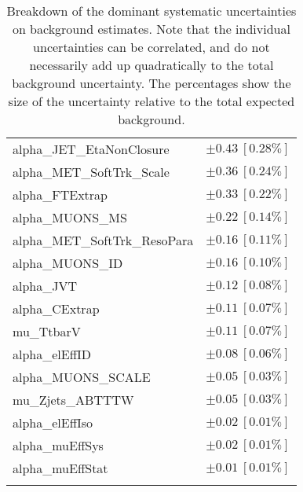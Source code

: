 \begin{table}
\begin{center}
\begin{tabular*}{\textwidth}{@{\extracolsep{\fill}}lc}
alpha\_JET\_EtaNonClosure         & $\pm 0.43\ [0.28\%] $       \\
alpha\_MET\_SoftTrk\_Scale         & $\pm 0.36\ [0.24\%] $       \\
alpha\_FTExtrap         & $\pm 0.33\ [0.22\%] $       \\
alpha\_MUONS\_MS         & $\pm 0.22\ [0.14\%] $       \\
alpha\_MET\_SoftTrk\_ResoPara         & $\pm 0.16\ [0.11\%] $       \\
alpha\_MUONS\_ID         & $\pm 0.16\ [0.10\%] $       \\
alpha\_JVT         & $\pm 0.12\ [0.08\%] $       \\
alpha\_CExtrap         & $\pm 0.11\ [0.07\%] $       \\
mu\_TtbarV         & $\pm 0.11\ [0.07\%] $       \\
alpha\_elEffID         & $\pm 0.08\ [0.06\%] $       \\
alpha\_MUONS\_SCALE         & $\pm 0.05\ [0.03\%] $       \\
mu\_Zjets\_ABTTTW         & $\pm 0.05\ [0.03\%] $       \\
alpha\_elEffIso         & $\pm 0.02\ [0.01\%] $       \\
alpha\_muEffSys         & $\pm 0.02\ [0.01\%] $       \\
alpha\_muEffStat         & $\pm 0.01\ [0.01\%] $       \\
\noalign{\smallskip}\hline\noalign{\smallskip}
\end{tabular*}
\end{center}
\caption[Breakdown of uncertainty on background estimates]{
Breakdown of the dominant systematic uncertainties on background estimates.
Note that the individual uncertainties can be correlated, and do not necessarily add up quadratically to 
the total background uncertainty. The percentages show the size of the uncertainty relative to the total expected background.
\label{table.results.bkgestimate.uncertainties.VRW}}
\end{table}
%